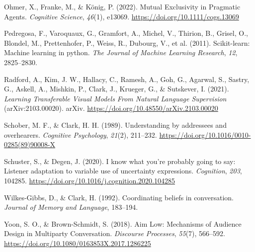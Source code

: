 \documentclass[10pt, letterpaper]{article}
\begin{document}
\begin{CSLReferences}{1}{0}
Ohmer, X., Franke, M., \& König, P. (2022). Mutual {Exclusivity} in
{Pragmatic Agents}. \emph{Cognitive Science}, \emph{46}(1), e13069.
\url{https://doi.org/10.1111/cogs.13069}

Pedregosa, F., Varoquaux, G., Gramfort, A., Michel, V., Thirion, B.,
Grisel, O., Blondel, M., Prettenhofer, P., Weiss, R., Dubourg, V., et
al. (2011). Scikit-learn: {Machine} learning in python. \emph{The
Journal of Machine Learning Research}, \emph{12}, 2825--2830.

Radford, A., Kim, J. W., Hallacy, C., Ramesh, A., Goh, G., Agarwal, S.,
Sastry, G., Askell, A., Mishkin, P., Clark, J., Krueger, G., \&
Sutskever, I. (2021). \emph{Learning {Transferable Visual Models From
Natural Language Supervision}} (arXiv:2103.00020). arXiv.
\url{https://doi.org/10.48550/arXiv.2103.00020}

Schober, M. F., \& Clark, H. H. (1989). Understanding by addressees and
overhearers. \emph{Cognitive Psychology}, \emph{21}(2), 211--232.
\url{https://doi.org/10.1016/0010-0285(89)90008-X}

Schuster, S., \& Degen, J. (2020). I know what you're probably going to
say: {Listener} adaptation to variable use of uncertainty expressions.
\emph{Cognition}, \emph{203}, 104285.
\url{https://doi.org/10.1016/j.cognition.2020.104285}

Wilkes-Gibbs, D., \& Clark, H. (1992). Coordinating beliefs in
conversation. \emph{Journal of Memory and Language}, 183--194.

Yoon, S. O., \& Brown-Schmidt, S. (2018). Aim {Low}: {Mechanisms} of
{Audience Design} in {Multiparty Conversation}. \emph{Discourse
Processes}, \emph{55}(7), 566--592.
\url{https://doi.org/10.1080/0163853X.2017.1286225}

\end{CSLReferences}


\end{document}
